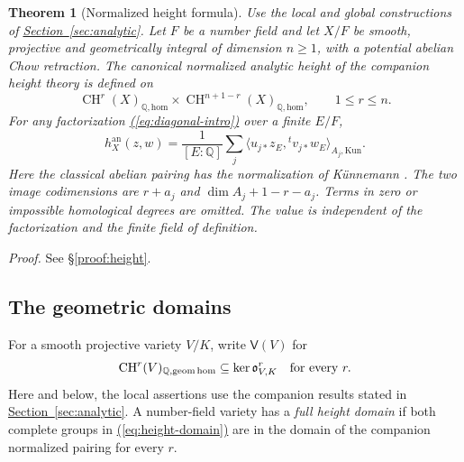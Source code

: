 \documentclass[11pt,a4paper]{article}
\newtheorem{theorem}{Theorem}[section]
\theoremstyle{definition}
\theoremstyle{remark}\newtheorem{remark}[theorem]{Remark}
\numberwithin{equation}{section}
\newcommand{\Q}{\mathbb Q}\newcommand{\R}{\mathbb R}\newcommand{\C}{\mathbb C}
\newcommand{\CH}{\operatorname{CH}}\newcommand{\an}{\mathrm{an}}
\newcommand{\homol}{\mathrm{hom}}\newcommand{\BC}{\mathrm{BC}}
\newcommand{\secref}[1]{\hyperref[#1]{\textcolor{sectionlink}{Section~\ref*{#1}}}}
\newcommand{\subref}[1]{\hyperref[#1]{\textcolor{sectionlink}{\S\ref*{#1}}}}
\renewcommand{\eqref}[1]{\hyperref[#1]{\textcolor{equationlink}{(\ref*{#1})}}}
\newcommand{\proofloc}[1]{\emph{Proof.} See \subref{#1}.}
\begin{document}
\begin{theorem}[Normalized height formula]\label{thm:height-main}
Use the local and global constructions of \secref{sec:analytic}.
Let $F$ be a number field and let $X/F$ be smooth, projective and
geometrically integral of dimension $n\ge1$, with a potential abelian
Chow retraction. The canonical normalized analytic height of the companion
height theory is defined on
\begin{equation}\label{eq:height-domain}
 \CH^r(X)_{\Q,\homol}\times\CH^{n+1-r}(X)_{\Q,\homol},
 \qquad 1\le r\le n.
\end{equation}
For any factorization \eqref{eq:diagonal-intro} over a finite $E/F$,
\begin{equation}\label{eq:height-main}
 h_X^{\an}(z,w)=\frac1{[E:\Q]}\sum_j
       \bigl\langle u_{j*}z_E,{}^tv_{j*}w_E\bigr\rangle_{A_j,\mathrm{Kun}}.
\end{equation}
Here the classical abelian pairing has the normalization of K\"unnemann
\cite{Kun}. The two image codimensions are
$r+a_j$ and $\dim A_j+1-r-a_j$. Terms in zero or impossible homological
degrees are omitted. The value is independent of the factorization and
the finite field of definition.
\end{theorem}

\proofloc{proof:height}


\subsection{The geometric domains}

For a smooth projective variety $V/K$, write $\mathsf V(V)$ for
\[
 \CH^r(V)_{\Q,\geomhom}\subseteq\ker\ob^r_{V,K}
 \quad\text{for every }r.
\]
Here and below, the local assertions use the companion results stated in
\secref{sec:analytic}. A number-field variety has a \emph{full height
domain} if both complete groups in \eqref{eq:height-domain} are in the
domain of the companion normalized pairing for every $r$.
\end{document}
